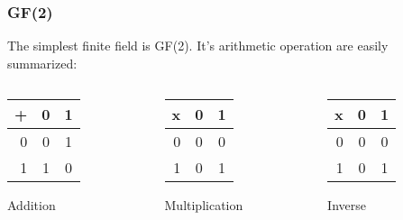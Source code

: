 \documentclass[xcolor={usenames,dvipsnames}]{beamer}
\begin{document}
\begin{frame}
\frametitle{GF(2)}

The simplest finite field is GF(2). It's arithmetic operation are easily summarized:
\bigskip
\begin{columns}
\begin{column}{0.3\linewidth}
\centering
\begin{tabular}{r|*{2}{c}}
+ & 0 & 1\\
\hline
0 & 0 & 1\\
1 & 1 & 0\\
\end{tabular}

\vspace*{.5\baselineskip}
Addition
\end{column}
\begin{column}{0.3\linewidth}
\centering
\begin{tabular}{r|*{2}{c}}
x & 0 & 1\\
\hline
0 & 0 & 0\\
1 & 0 & 1\\
\end{tabular}

\vspace*{.5\baselineskip}
Multiplication
\end{column}
\begin{column}{0.3\linewidth}
\centering
\begin{tabular}{r|*{2}{c}}
x & 0 & 1\\
\hline
0 & 0 & 0\\
1 & 0 & 1\\
\end{tabular}

\vspace*{.5\baselineskip}
Inverse
\end{column}
\end{columns}
\end{frame}    
\end{document}
